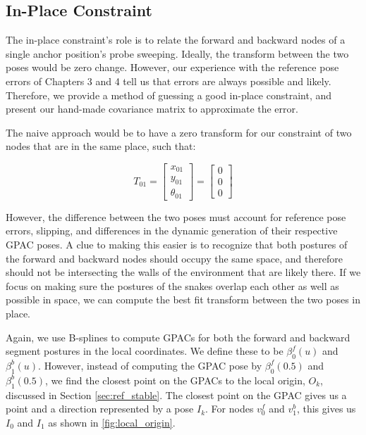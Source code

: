 \subsection{In-Place Constraint}
\label{in-placeconstraint}

The in-place constraint's role is to relate the forward and backward nodes of a single anchor position's probe sweeping. Ideally, the transform between the two poses would be zero change. However, our experience with the reference pose errors of Chapters 3 and 4 tell us that errors are always possible and likely. Therefore, we provide a method of guessing a good in-place constraint, and present our hand-made covariance matrix to approximate the error. 

The naive approach would be to have a zero transform for our constraint of two nodes that are in the same place, such that:


\begin{equation}
T_{01} = 
\begin{bmatrix}
x_{01} \\
y_{01} \\
\theta_{01}
\end{bmatrix}
= 
\begin{bmatrix}
0 \\
0 \\
0
\end{bmatrix}
\end{equation}


However, the difference between the two poses must account for reference pose errors, slipping, and differences in the dynamic generation of their respective GPAC poses. A clue to making this easier is to recognize that both postures of the forward and backward nodes should occupy the same space, and therefore should not be intersecting the walls of the environment that are likely there. If we focus on making sure the postures of the snakes overlap each other as well as possible in space, we can compute the best fit transform between the two poses in place.

Again, we use B-splines to compute GPACs for both the forward and backward segment postures in the local coordinates. We define these to be $\beta_0^f(u)$ and $\beta_1^b(u)$. However, instead of computing the GPAC pose by $\beta_0^f(0.5)$ and $\beta_1^b(0.5)$, we find the closest point on the GPACs to the local origin, $O_k$, discussed in Section \autoref{sec:ref_stable}. The closest point on the GPAC gives us a point and a direction represented by a pose $I_k$. For nodes $v^f_0$ and $v^b_1$, this gives us $I_0$ and $I_1$ as shown in \autoref{fig:local_origin}.

